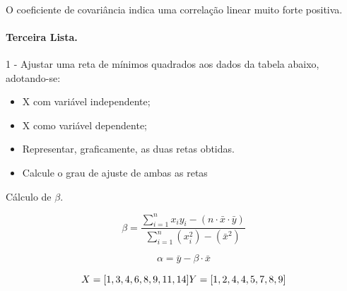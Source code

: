 \documentclass[11pt]{article}
\providecommand{\tightlist}{%
      \setlength{\itemsep}{0pt}\setlength{\parskip}{0pt}}
\begin{document}
    
    \begin{center}
    \end{center}
    { \hspace*{\fill} \\}
    
    O coeficiente de covariância indica uma correlação linear muito forte
positiva.

    \paragraph{Terceira Lista.}\label{terceira-lista.}

1 - Ajustar uma reta de mínimos quadrados aos dados da tabela abaixo,
adotando-se:

\begin{itemize}
\tightlist
\item
  X com variável independente;\\
\item
  X como variável dependente;\\
\item
  Representar, graficamente, as duas retas obtidas.\\
\item
  Calcule o grau de ajuste de ambas as retas
\end{itemize}

Cálculo de \(\beta\).

\[
        \beta = \frac{\displaystyle\sum_{i=1}^{n} x_i y_i - (n\cdot\bar{x}\cdot\bar{y})}{\displaystyle\sum_{i=1}^{n}(x_i^2) - (\bar{x}^2)}
\]

\[
\alpha = \bar{y}-\beta\cdot \bar{x}
\]

\[
X = [1, 3, 4, 6, 8, 9, 11, 14]\\
Y = [1, 2, 4, 4, 5, 7, 8, 9]
\]
\end{document}
